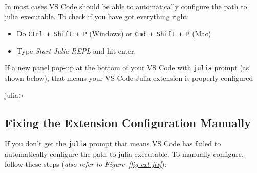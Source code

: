 \documentclass[
  letterpaper,
]{book}
\newenvironment{Shaded}{\begin{snugshade}}{\end{snugshade}}
\newcommand{\NormalTok}[1]{\textcolor[rgb]{0.00,0.23,0.31}{#1}}
\newcommand{\OperatorTok}[1]{\textcolor[rgb]{0.37,0.37,0.37}{#1}}
\providecommand{\tightlist}{%
  \setlength{\itemsep}{0pt}\setlength{\parskip}{0pt}}\usepackage{longtable,booktabs,array}
\begin{document}
In most cases VS Code should be able to automatically configure the path
to julia executable. To check if you have got everything right:

\begin{itemize}
\tightlist
\item
  Do \texttt{Ctrl\ +\ Shift\ +\ P} (Windows) or
  \texttt{Cmd\ +\ Shift\ +\ P} (Mac)
\item
  Type \emph{Start Julia REPL }and hit enter.
\end{itemize}

If a new panel pop-up at the bottom of your VS Code with \texttt{julia}
prompt (as shown below), that means your VS Code Julia extension is
properly configured

\begin{Shaded}
\begin{Highlighting}[]
\NormalTok{julia}\OperatorTok{\textgreater{}}
\end{Highlighting}
\end{Shaded}

\hypertarget{sec-ext-config}{%
\subsection{Fixing the Extension Configuration
Manually}\label{sec-ext-config}}

If you don't get the \texttt{julia} prompt that means VS Code has failed
to automatically configure the path to julia executable. To manually
configure, follow these steps (\emph{also refer to
Figure~\ref{fig-ext-fix}}):
\end{document}
